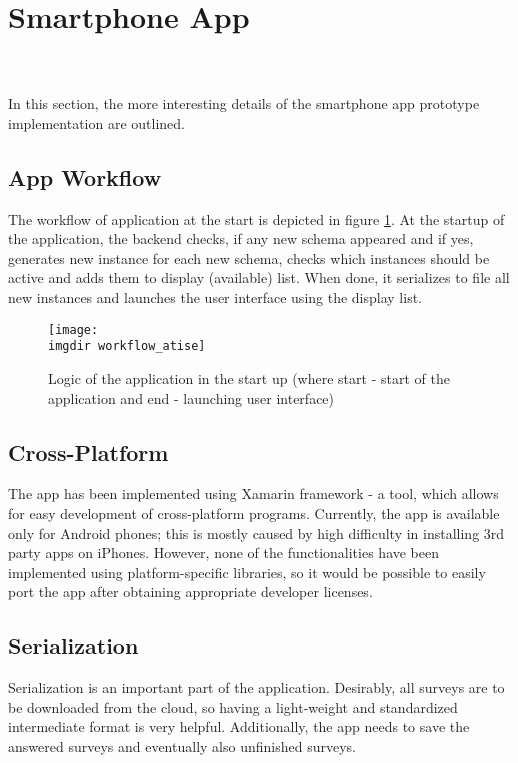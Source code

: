 \section{Smartphone App}
\label{sec:app}
\anna \\\\
In this section, the more interesting details of the smartphone app prototype implementation are outlined.

\subsection{App Workflow}
\label{subsec:workflow}
The workflow of application at the start is depicted in figure \ref{fig:startup-workflow}. At the startup of the application, the backend checks, if any new schema appeared and if yes, generates new instance for each new schema, checks which instances should be active and adds them to display (available) list. When done, it serializes to file all new instances and launches the user interface using the display list. 

\begin{figure}[!htbp]
  \centering
    \centering
    \texttt{[image: \\imgdir workflow\_atise]}
    \caption{Logic of the application in the start up (where start - start of the application and end - launching user interface)}
    \label{fig:startup-workflow}
\end{figure}

\subsection{Cross-Platform}
\label{subsec:crossplatform}
The app has been implemented using Xamarin framework - a tool, which allows for easy development of cross-platform programs. Currently, the app is available only for Android phones; this is mostly caused by high difficulty in installing 3rd party apps on iPhones. However, none of the functionalities have been implemented using platform-specific libraries, so it would be possible to easily port the app after obtaining appropriate developer licenses. 

\subsection{Serialization}
\label{subsec:serialization}
Serialization is an important part of the application. Desirably, all surveys are to be downloaded from the cloud, so having a light-weight and standardized intermediate format is very helpful. Additionally, the app needs to save the answered surveys and eventually also unfinished surveys.

